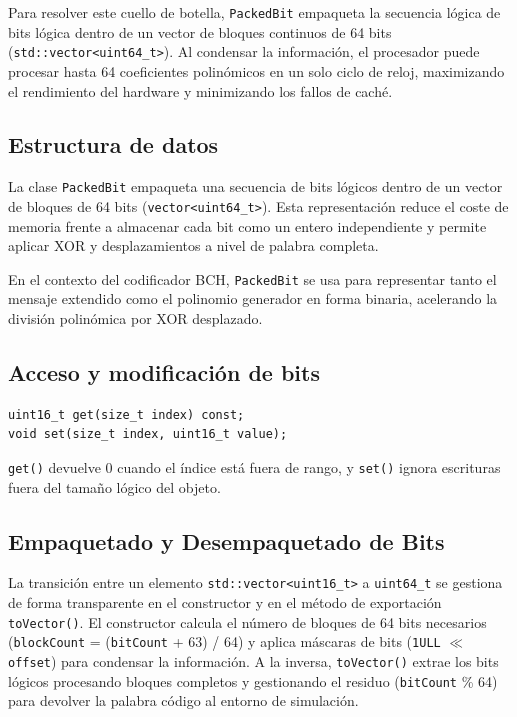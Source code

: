 Para resolver este cuello de botella, \texttt{PackedBit} empaqueta la secuencia lógica de bits lógica dentro de un vector de bloques continuos de 64 bits (\texttt{std::vector<uint64\_t>}). Al condensar la información, el procesador puede procesar hasta 64 coeficientes polinómicos en un solo ciclo de reloj, maximizando el rendimiento del hardware y minimizando los fallos de caché.

\subsection{Estructura de datos}

La clase \texttt{PackedBit} empaqueta una secuencia de bits lógicos dentro de un vector de bloques de 64 bits (\texttt{vector<uint64\_t>}). Esta representación reduce el coste de memoria frente a almacenar cada bit como un entero independiente y permite aplicar XOR y desplazamientos a nivel de palabra completa.

En el contexto del codificador BCH, \texttt{PackedBit} se usa para representar tanto el mensaje extendido como el polinomio generador en forma binaria, acelerando la división polinómica por XOR desplazado.


\subsection{Acceso y modificación de bits}

\begin{lstlisting}[style=CodigoCPP, caption={Declaración de los métodos \texttt{get} y \texttt{set} para la manipulación individual de bits en la estructura \texttt{PackedBit}.}, label={lst:packedbit_get_set}]
uint16_t get(size_t index) const;
void set(size_t index, uint16_t value);
\end{lstlisting}

\texttt{get()} devuelve 0 cuando el índice está fuera de rango, y \texttt{set()} ignora escrituras fuera del tamaño lógico del objeto.
\subsection{Empaquetado y Desempaquetado de Bits}

La transición entre un elemento \texttt{std::vector\textless uint16\_t\textgreater} a \texttt{uint64\_t} se gestiona de forma transparente en el constructor y en el método de exportación \texttt{toVector()}. El constructor calcula el número de bloques de 64 bits necesarios (\texttt{blockCount} = (\texttt{bitCount} + 63) / 64) y aplica máscaras de bits (\texttt{1ULL} $\ll$ \texttt{offset}) para condensar la información. A la inversa, \texttt{toVector()} extrae los bits lógicos procesando bloques completos y gestionando el residuo (\texttt{bitCount} \% 64) para devolver la palabra código al entorno de simulación.

